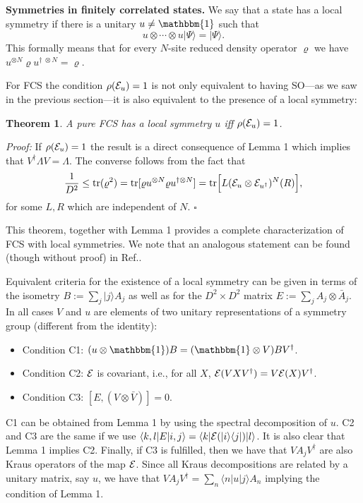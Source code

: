 \documentclass[prl,floatfix,showpacs,amsmat,twocolumn]{revtex4}
\newtheorem{theorem}{Theorem}
\newcommand{\1}{\mathbbm{1}}
\DeclareMathOperator{\trace}{tr} \DeclareMathOperator{\rank}{rank}
\renewcommand{\>}{\rangle}
\newcommand{\<}{\langle}
\begin{document}
\textbf{Symmetries in finitely correlated states.} We say that a
state has a local symmetry if there is a unitary $u\neq\1$ such
that
$$u\otimes \cdots \otimes
    u |\Psi\>=|\Psi\>.$$ This formally means that for every $N$-site
reduced density operator $\varrho$ we have $ u^{\otimes N}\varrho
    u^{\dagger \; \otimes N}=\varrho$.

For FCS the condition $\rho({\cal E}_u)=1$ is not only equivalent
to having SO---as we saw in the previous section---it is also
equivalent to the presence of a local symmetry:

\begin{theorem} A pure FCS has a local symmetry $u$ iff $\rho({\cal
            E}_u)=1$.\end{theorem}

{\it Proof:} If $\rho({\cal E}_u)=1$ the result is a direct
consequence of Lemma 1 which implies that $V^\dagger \Lambda
    V=\Lambda$. The converse follows from the fact that
$$\frac{1}{D^2}\le \trace(\varrho^2)=\trace[\varrho u^{\otimes N}\varrho
        u^{\dagger \otimes N}]={\rm tr}\Big[L({\cal E}_u\otimes {\cal
            E}_{u^\dagger})^N(R)\Big],$$ for some $L,R$ which are independent
of $N$. $\square$

This theorem, together with Lemma 1 provides a complete
characterization of FCS with local symmetries. We note that an
analogous statement can be found (though without proof) in
Ref.\cite{FaNaWe}.



Equivalent criteria for the existence of a local symmetry can be
given in terms of the isometry $B:=\sum_j |j\rangle A_j$ as well
as for the $D^2\times D^2$ matrix $E:=\sum_j A_j\otimes \bar A_j$.
In all cases $V$ and $u$ are elements of two unitary
representations of a symmetry group (different from the identity):
\begin{itemize}
    \item Condition C1: $(u\otimes \1)B=(\1\otimes V)BV^\dagger$.
    \item Condition C2: ${\cal E}$ is
          covariant, i.e., for all $X$, ${\cal E}(V X V^\dagger)=V{\cal
              E}(X)V^\dagger$.
    \item Condition C3: $[E, (V\otimes \bar V)]=0$.
\end{itemize}
C1 can
be obtained from Lemma 1 by using the spectral decomposition of
$u$. C2 and C3 are the same if we use $\langle
    k,l|E|i,j\rangle=\langle k|{\cal E}(|i\rangle\langle
    j|)|l\rangle$. It is also clear that Lemma 1 implies C2. Finally,
if C3 is fulfilled, then we have that $VA_j V^\dagger$ are also
Kraus operators of the map ${\cal E}$. Since all Kraus
decompositions are related by a unitary matrix, say $u$, we have
that $VA_j V^\dagger = \sum_n \langle n|u|j\rangle A_n$ implying
the condition of Lemma 1.
\end{document}
